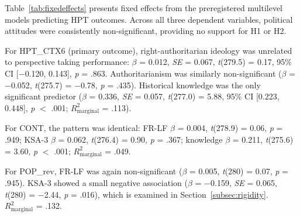 \documentclass[referee,pdflatex,sn-apa]{sn-jnl}
\begin{document}
Table~\ref{tab:fixedeffects} presents fixed effects from the preregistered multilevel models predicting HPT outcomes. Across all three dependent variables, political attitudes were consistently non-significant, providing no support for H1 or H2.

For HPT\_CTX6 (primary outcome), right-authoritarian ideology was unrelated to perspective taking performance: $\beta$ = 0.012, \textit{SE} = 0.067, \textit{t}(279.5) = 0.17, 95\% CI [$-$0.120, 0.143], \textit{p} = .863. Authoritarianism was similarly non-significant ($\beta$ = $-$0.052, \textit{t}(275.7) = $-$0.78, \textit{p} = .435). Historical knowledge was the only significant predictor ($\beta$ = 0.336, \textit{SE} = 0.057, \textit{t}(277.0) = 5.88, 95\% CI [0.223, 0.448], \textit{p} $<$ .001; $R^2_{\text{marginal}}$ = .113).

For CONT, the pattern was identical: FR-LF $\beta$ = 0.004, \textit{t}(278.9) = 0.06, \textit{p} = .949; KSA-3 $\beta$ = 0.062, \textit{t}(276.4) = 0.90, \textit{p} = .367; knowledge $\beta$ = 0.211, \textit{t}(275.6) = 3.60, \textit{p} $<$ .001; $R^2_{\text{marginal}}$ = .049.

For POP\_rev, FR-LF was again non-significant ($\beta$ = 0.005, \textit{t}(280) = 0.07, \textit{p} = .945). KSA-3 showed a small negative association ($\beta$ = $-$0.159, \textit{SE} = 0.065, \textit{t}(280) = $-$2.44, \textit{p} = .016), which is examined in Section~\ref{subsec:rigidity}. $R^2_{\text{marginal}}$ = .132.
\end{document}
